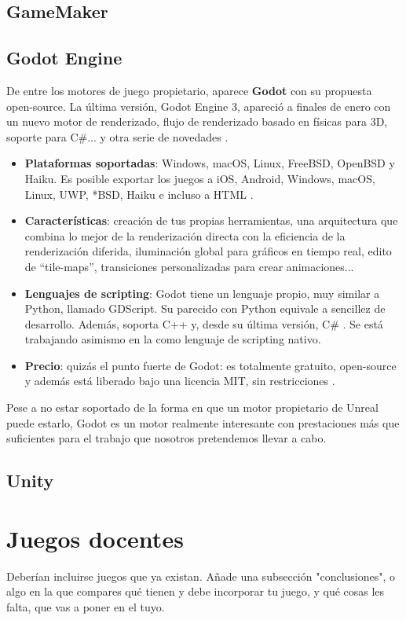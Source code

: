 \subsection{GameMaker}

\subsection{Godot Engine}
De entre los motores de juego propietario, aparece \textbf{Godot} con su propuesta open-source. La última versión, Godot Engine 3, apareció a finales de enero con un nuevo motor de renderizado, flujo de renderizado basado en físicas para 3D, soporte para C\#... y otra serie de novedades \cite{newgodot}.
\begin{itemize}
\item \textbf{Plataformas soportadas}: Windows, macOS, Linux, FreeBSD, OpenBSD y Haiku. Es posible exportar los juegos a iOS, Android, Windows, macOS, Linux, UWP, *BSD, Haiku e incluso a HTML \cite{godotfeatures}.
\item \textbf{Características}: creación de tus propias herramientas, una arquitectura que combina lo mejor de la renderización directa con la eficiencia de la renderización diferida, iluminación global para gráficos en tiempo real, edito de ``tile-maps'', transiciones personalizadas para crear animaciones...\cite{godotfeatures}
\item \textbf{Lenguajes de scripting}: Godot tiene un lenguaje propio, muy similar a Python, llamado GDScript. Su parecido con Python equivale a sencillez de desarrollo. Además, soporta C++ y, desde su última versión, C\# \cite{godotfeatures}. Se está trabajando asimismo en la  como lenguaje de scripting nativo.
\item \textbf{Precio}: quizás el punto fuerte de Godot: es totalmente gratuito, open-source y además está liberado bajo una licencia MIT, sin restricciones \cite{godotfree}.
\end{itemize}

Pese a no estar soportado de la forma en que un motor propietario de Unreal puede estarlo, Godot es un motor realmente interesante con prestaciones más que suficientes para el trabajo que nosotros pretendemos llevar a cabo.

\subsection{Unity}

\section{Juegos docentes}
Deberían incluirse juegos que ya existan. Añade una subsección "conclusiones", o algo en la que compares qué tienen y debe incorporar tu juego, y qué cosas les falta, que vas a poner en el tuyo.